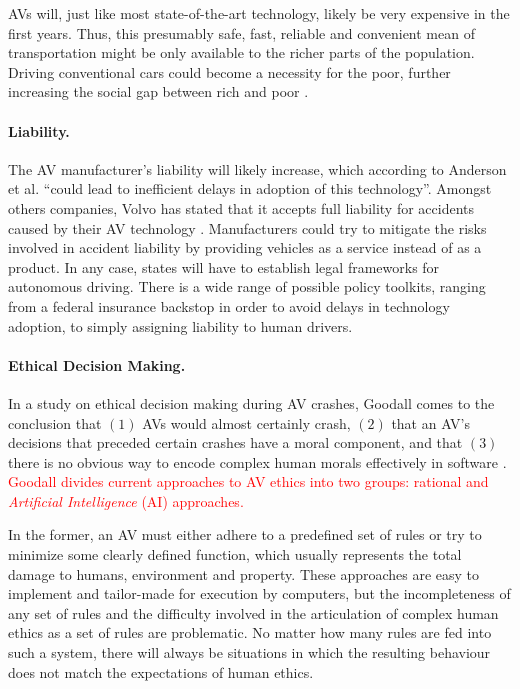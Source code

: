 \documentclass[11pt]{article}
\newcommand{\changed}[1]{\textcolor{red}{#1}}
\begin{document}
AVs will, just like most state-of-the-art technology, likely be very expensive in the first years. Thus, this presumably safe, fast, reliable and convenient mean of transportation might be only available to the richer parts of the population. Driving conventional cars could become a necessity for the poor, further increasing the social gap between rich and poor \cite[p. 39]{Anderson2014rand}.

\paragraph{Liability.}
The AV manufacturer's liability will likely increase, which according to Anderson et al. ``could lead to inefficient delays in adoption of this technology''. Amongst others companies, Volvo has stated that it accepts full liability for accidents caused by their AV technology \cite{HarrisVolvo2015}. Manufacturers could try to mitigate the risks involved in accident liability by providing vehicles as a service instead of as a product. In any case, states will have to establish legal frameworks for autonomous driving. There is a wide range of possible policy toolkits, ranging from a federal insurance backstop in order to avoid delays in technology adoption, to simply assigning liability to human drivers.

\paragraph{Ethical Decision Making.}
In a study on ethical decision making during AV crashes, Goodall comes to the conclusion that $(1)$ AVs would almost certainly crash, $(2)$ that an AV's decisions that preceded certain crashes have a moral component, and that $(3)$ there is no obvious way to encode complex human morals effectively in software \cite{Goodall2014ethical}. \changed{Goodall divides current approaches to AV ethics into two groups: rational and \textit{Artificial Intelligence} (AI) approaches.}

In the former, an AV must either adhere to a predefined set of rules or try to minimize some clearly defined function, which usually represents the total damage to humans, environment and property. These approaches are easy to implement and tailor-made for execution by computers, but the incompleteness of any set of rules and the difficulty involved in the articulation of complex human ethics as a set of rules are problematic. No matter how many rules are fed into such a system, there will always be situations in which the resulting behaviour does not match the expectations of human ethics.
\end{document}
